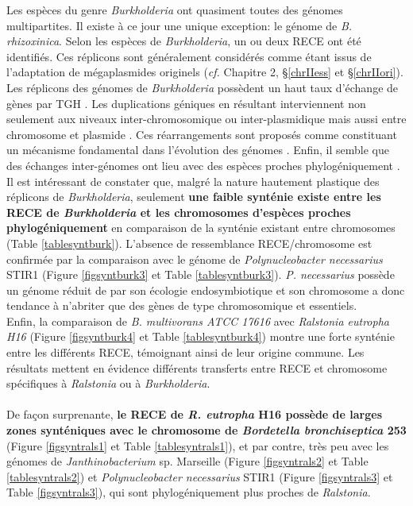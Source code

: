 Les espèces du genre \textit{Burkholderia} ont quasiment toutes des génomes multipartites. Il existe à ce jour une unique exception: le génome de \textit{B. rhizoxinica}. Selon les espèces de \textit{Burkholderia}, un ou deux RECE ont été identifiés. Ces réplicons sont généralement considérés comme étant issus de l'adaptation de mégaplasmides originels (\textit{cf.} Chapitre 2, \S \ref{chrIIess} et \S \ref{chrIIori}). Les réplicons des génomes de \textit{Burkholderia} possèdent un haut taux d'échange de gènes par TGH \citep{maida2014origin}. Les duplications géniques en résultant interviennent non seulement aux niveaux inter-chromosomique ou inter-plasmidique mais aussi entre chromosome et plasmide \citep{Passot2012}. Ces réarrangements sont proposés comme constituant un mécanisme fondamental dans l'évolution des génomes \citep{maida2014origin}. Enfin, il semble que des échanges inter-génomes ont lieu avec des espèces proches phylogéniquement \citep{maida2014origin}.\\	 
   Il est intéressant de constater que, malgré la nature hautement plastique des réplicons de \textit{Burkholderia}, seulement \textbf{\color{orange} une faible synténie existe entre les RECE de \textit{Burkholderia} et les chromosomes d'espèces proches phylogéniquement} en comparaison de la synténie existant entre chromosomes (Table \ref{tablesyntburk}). L'absence de ressemblance RECE/chromosome est confirmée par la comparaison avec le génome de \textit{Polynucleobacter necessarius} STIR1 (Figure \ref{figsyntburk3} et Table \ref{tablesyntburk3}). \textit{P. necessarius} possède un génome réduit de par son écologie endosymbiotique et son chromosome a donc tendance à n'abriter que des gènes de type chromosomique et essentiels. \\
Enfin, la comparaison de \textit{B. multivorans ATCC 17616} avec \textit{Ralstonia eutropha H16}  (Figure \ref{figsyntburk4} et Table \ref{tablesyntburk4}) montre une forte synténie entre les différents RECE, témoignant ainsi de leur origine commune. Les résultats mettent en évidence différents transferts entre RECE et chromosome spécifiques à \textit{Ralstonia} ou à \textit{Burkholderia}. \\
\\
De façon surprenante, \textbf{le RECE de \textit{R. eutropha} H16 possède de larges zones synténiques avec le chromosome de \textit{Bordetella bronchiseptica} 253} (Figure \ref{figsyntrals1} et Table \ref{tablesyntrals1}), et par contre, très peu avec les génomes de \textit{Janthinobacterium} sp. Marseille (Figure \ref{figsyntrals2} et Table \ref{tablesyntrals2}) et \textit{Polynucleobacter necessarius} STIR1 (Figure \ref{figsyntrals3} et Table \ref{figsyntrals3}), qui sont phylogéniquement plus proches de \textit{Ralstonia}. 


